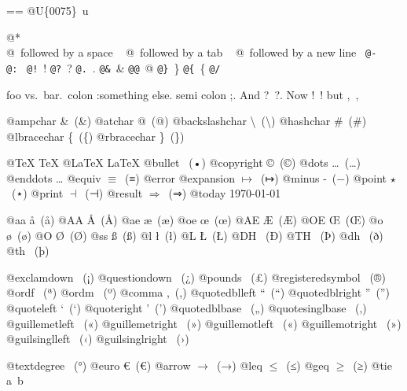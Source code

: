 \documentclass{book}
\makeatletter
\newenvironment{Texinfopreformatted}{%
  \par\GNUTobeylines\obeyspaces\frenchspacing\parskip=\z@\parindent=\z@}{}
{\catcode`\^^M=13 \gdef\GNUTobeylines{\catcode`\^^M=13 \def^^M{\null\par}}}
\newenvironment{Texinfoindented}{\begin{list}{}{}\item\relax}{\end{list}}
\renewcommand{\_}{\Texinfounderscore\discretionary{}{}{}}
\makeatother
\begin{document}
\begin{Texinfoindented}
\begin{Texinfopreformatted}
@U\{0075\}\ u

@* \leavevmode{}\\
@\ followed by a space
\ {}
@\ followed by a tab
\ {}
@\ followed by a new line
\ {}\texttt{@-}\ \-{}
\texttt{@:}\ \@
\texttt{@!}\ \@!
\texttt{@?}\ \@?
\texttt{@.}\ \@.
\texttt{@\&}\ \&
\texttt{@@}\ @
\texttt{@\}}\ \}
\texttt{@\{}\ \{
\texttt{@/}\ 

foo vs.\@\ bar.\ 
colon :\@And something else.
semi colon ;\@.
And ?\ ?\@.
Now !\ !\@@
but ,\ ,\@

@ampchar \&\ (\&)
@atchar @\ (@)
@backslashchar \textbackslash{}\ (\textbackslash{})
@hashchar \#\ (\#)
@lbracechar \{\ (\{)
@rbracechar \}\ (\})

@TeX \TeX{}
@LaTeX \LaTeX{}
@bullet \textbullet{}\ (•)
@copyright \copyright{}\ (©)
@dots \dots{}\@\ (…)
@enddots \dots{}
@equiv $\equiv{}$\ (≡)
@error 
@expansion $\mapsto{}$\ (↦)
@minus -\ (−)
@point $\star{}$\ (⋆)
@print $\dashv{}$\ (⊣)
@result $\Rightarrow{}$\ (⇒)
@today \today{}

@aa \aa{}\ (å)
@AA \AA{}\ (Å)
@ae \ae{}\ (æ)
@oe \oe{}\ (œ)
@AE \AE{}\ (Æ)
@OE \OE{}\ (Œ)
@o \o{}\ (ø)
@O \O{}\ (Ø)
@ss \ss{}\ (ß)
@l \l{}\ (ł)
@L \L{}\ (Ł)
@DH \DH{}\ (Ð)
@TH \TH{}\ (Þ)
@dh \dh{}\ (ð)
@th \th{}\ (þ)

@exclamdown \textexclamdown{}\ (¡)
@questiondown \textquestiondown{}\ (¿)
@pounds \textsterling{}\ (£)
@registeredsymbol \circledR{}\ (®)
@ordf \textordfeminine{}\ (ª)
@ordm \textordmasculine{}\ (º)
@comma ,\ (,)
@quotedblleft \textquotedblleft{}\ (“)
@quotedblright \textquotedblright{}\ (”)
@quoteleft \textquoteleft{}\ (‘)
@quoteright \textquoteright{}\ (’)
@quotedblbase \quotedblbase{}\ („)
@quotesinglbase \quotesinglbase{}\ (‚)
@guillemetleft \guillemotleft{}\ («)
@guillemetright \guillemotright{}\ (»)
@guillemotleft \guillemotleft{}\ («)
@guillemotright \guillemotright{}\ (»)
@guilsinglleft \guilsinglleft{}\ (‹)
@guilsinglright \guilsinglright{}\ (›)

@textdegree \textdegree{}\ (°)
@euro \euro{}\ (€)
@arrow $\rightarrow{}$\ (→)
@leq $\leq{}$\ (≤)
@geq $\geq{}$\ (≥)
@tie a~b


\end{Texinfopreformatted}
\end{Texinfoindented}
\end{document}
